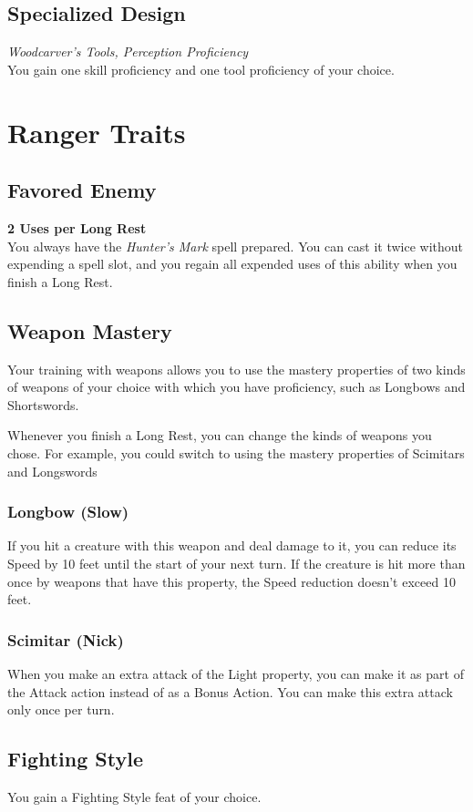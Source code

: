 \documentclass[letterpaper,openany,oneside,twocolumn]{book}
\begin{document}
\subsection*{Specialized Design}
\textit{Woodcarver's Tools, Perception Proficiency}\\
You gain one skill proficiency and one tool proficiency of your choice.

\section*{Ranger Traits}
\subsection*{Favored Enemy}
\textbf{2 Uses per Long Rest}\\
You always have the \textit{Hunter's Mark} spell prepared. You can cast it twice without expending a spell slot, and you regain all expended uses of this ability when you finish a Long Rest.
\subsection*{Weapon Mastery}
Your training with weapons allows you to use the mastery properties of two kinds of weapons of your choice with which you have proficiency, such as Longbows and Shortswords.

Whenever you finish a Long Rest, you can change the kinds of weapons you chose. For example, you could switch to using the mastery properties of Scimitars and Longswords
\subsubsection*{Longbow (Slow)}
If you hit a creature with this weapon and deal damage to it, you can reduce its Speed by 10 feet until the start of your next turn. If the creature is hit more than once by weapons that have this property, the Speed reduction doesn't exceed 10 feet.
\subsubsection*{Scimitar (Nick)}
When you make an extra attack of the Light property, you can make it as part of the Attack action instead of as a Bonus Action. You can make this extra attack only once per turn.
\subsection*{Fighting Style}
You gain a Fighting Style feat of your choice.
\end{document}
